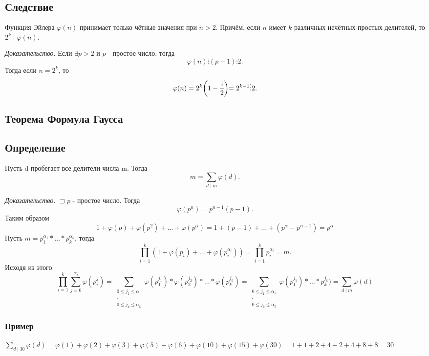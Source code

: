 \documentclass[12pt]{article}
\begin{document}
\subsection{Следствие} Функция Эйлера $\varphi(n)$ принимает только чётные значения при $n>2$. Причём, если $n$ имеет $k$ различных нечётных простых делителей, то $2^{k}\mid\varphi(n)$.
\par \textit{Доказательство.} Если $\exists p>2$ и $p$ - простое число, тогда \[\varphi(n)\vdots(p-1)\vdots2.\] Тогда если $n=2^{k}$, то \[\varphi(n)=2^{k}\biggl(1-\cfrac{1}{2}\biggl)=2^{k-1}\vdots2.\]

\subsection{Теорема Формула Гаусса}
\subsection{Определение} Пусть d пробегает все делители числа m. Тогда \[m=\sum_{d\mid m}\varphi(d).\]
\par \textit{Доказательство.} $\sqsupset p$ - простое число. Тогда \[\varphi(p^{n})=p^{n-1}(p-1).\] Таким образом \[1+\varphi(p)+\varphi(p^{2})+\dots+\varphi(p^{\alpha})=1+(p-1)+\dots+(p^{\alpha}-p^{\alpha-1})=p^{\alpha}\] Пусть $m=p^{\alpha_{1}}_{1}*\dots*p^{\alpha_{k}}_{k}$, тогда \[\prod^{k}_{i=1}(1+\varphi(p_{i})+\dots+\varphi(p^{\alpha_{i}}_{i}))=\prod^{k}_{i=1}p^{\alpha_{i}}_{i}=m.\] Исходя из этого \[\prod^{k}_{i=1}\sum^{\alpha_{i}}_{j=0}\varphi(p^{j}_{i})=\sum_{\substack{
            0\leq j_{1}\leq \alpha_{1} \\
            \vdots \\
            0\leq j_{k}\leq \alpha_{k}
        }}\varphi(p^{j_{1}}_{1})*\varphi(p^{j_{2}}_{2})*\dots*\varphi(p^{j_{k}}_{k})=\sum_{\substack{
            0\leq j_{1}\leq \alpha_{1} \\
            \vdots \\
            0\leq j_{k}\leq \alpha_{k}
        }}\varphi(p^{j_{1}}_{1})*\dots*p^{j_{k}}_{k})=\sum_{d\mid m}\varphi(d)\]
\subsubsection{Пример} $\displaystyle\sum_{d\mid 30}\varphi(d)=\varphi(1)+\varphi(2)+\varphi(3)+\varphi(5)+\varphi(6)+\varphi(10)+\varphi(15)+\varphi(30)=1+1+2+4+2+4+8+8=30$
\end{document}

